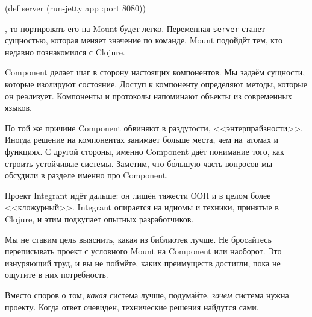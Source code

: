\else

\begin{english}
  \begin{clojure}
(def server (run-jetty app {:port 8080}))
  \end{clojure}
\end{english}

\fi

\noindent
, то портировать его на Mount будет легко. Переменная \verb|server| станет
сущностью, которая меняет значение по команде. Mount подойдёт тем, кто недавно
познакомился с Clojure.

Component делает шаг в сторону настоящих компонентов. Мы задаём сущности,
которые изолируют состояние. Доступ к компоненту определяют методы, которые он
реализует. Компоненты и протоколы напоминают объекты из современных языков.

По той же причине Component обвиняют в раздутости, <<энтерпрайзности>>. Иногда
решение на компонентах занимает больше места, чем на~атомах и функциях. С другой
стороны, именно Component даёт понимание того, как строить устойчивые
системы. Заметим, что б\'{о}льшую часть вопросов мы обсудили в разделе именно
про Component.

Проект Integrant идёт дальше: он лишён тяжести ООП и в целом более
<<кложурный>>. Integrant опирается на идиомы и техники, принятые в Clojure, и
этим подкупает опытных разработчиков.

Мы не ставим цель выяснить, какая из библиотек лучше. Не бросайтесь переписывать
проект с условного Mount на Component или наоборот. Это изнуряющий труд, и вы не
поймёте, каких преимуществ достигли, пока не ощутите в них потребность.

Вместо споров о том, \emph{какая} система лучше, подумайте, \emph{зачем} система
нужна проекту. Когда ответ очевиден, технические решения найдутся сами.
